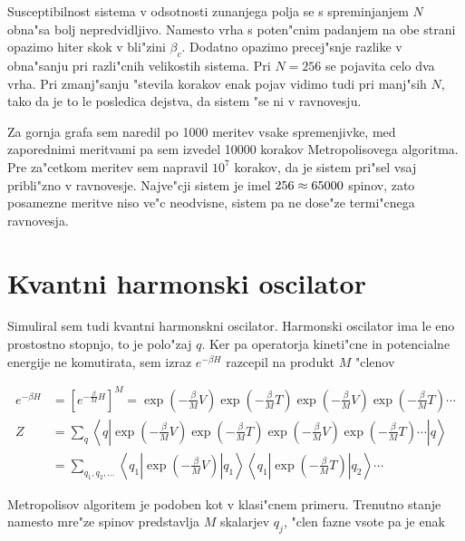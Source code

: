 \documentclass[a4paper,10pt]{article}
\begin{document}
\begin{figure}[H]
 \centering
 
\end{figure}

Susceptibilnost sistema v odsotnosti zunanjega polja se s spreminjanjem $N$ obna"sa bolj nepredvidljivo. 
Namesto vrha s poten"cnim padanjem na obe strani opazimo hiter skok v bli"zini $\beta_c$. 
Dodatno opazimo precej"snje razlike v obna"sanju pri razli"cnih velikostih sistema. 
Pri $N=256$ se pojavita celo dva vrha. 
Pri zmanj"sanju "stevila korakov enak pojav vidimo tudi pri manj"sih $N$, tako da je to le posledica dejstva, da sistem "se ni v ravnovesju. 

Za gornja grafa sem naredil po 1000 meritev vsake spremenjivke, med zaporednimi meritvami pa sem izvedel 10000 korakov Metropolisovega algoritma. 
Pre za"cetkom meritev sem napravil $10^7$ korakov, da je sistem pri"sel vsaj pribli"zno v ravnovesje. 
Najve"cji sistem je imel $256 \time 256 \approx 65000$ spinov, zato posamezne meritve niso ve"c neodvisne, sistem pa ne dose"ze termi"cnega ravnovesja. 

\section{Kvantni harmonski oscilator}

Simuliral sem tudi kvantni harmonskni oscilator. 
Harmonski oscilator ima le eno prostostno stopnjo, to je polo"zaj $q$. 
Ker pa operatorja kineti"cne in potencialne energije ne komutirata, sem izraz $e^{-\beta H}$ razcepil na produkt $M$ "clenov

\begin{align}
 e^{-\beta H} &= \left[e^{-\frac{\beta}{M}H}\right]^M = \exp\left(-{\frac{\beta}{M}V}\right) \exp\left(-{\frac{\beta}{M}T}\right) \exp\left(-{\frac{\beta}{M}V}\right) \exp\left(-{\frac{\beta}{M}T}\right) \cdots \\
 Z &= \sum_{q} \left\langle q \left|\exp\left(-{\frac{\beta}{M}V}\right) \exp\left(-{\frac{\beta}{M}T}\right) \exp\left(-{\frac{\beta}{M}V}\right) \exp\left(-{\frac{\beta}{M}T}\right) \cdots \right| q \right\rangle \\
 &= \sum_{q_1, q_2, \ldots} \left\langle q_1 \left|\exp\left(-{\frac{\beta}{M}V}\right) \right|q_1\right\rangle \left\langle q_1 \left| \exp\left(-{\frac{\beta}{M}T}\right) \right|q_2\right\rangle \cdots
\end{align}


Metropolisov algoritem je podoben kot v klasi"cnem primeru.
Trenutno stanje namesto mre"ze spinov predstavlja $M$ skalarjev $q_j$, "clen fazne vsote pa je enak
\end{document}
